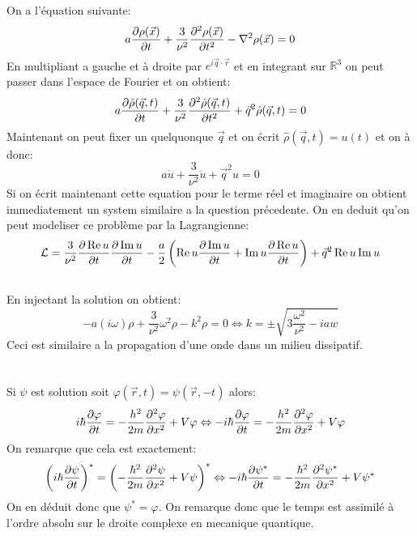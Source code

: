 \documentclass[10pt,a4paper]{article}
\begin{document}
\subsection{}
On a l'équation suivante:
\[
a \pdv{\rho(\vec{x})}{t} + \frac{3}{\nu^2} \pdv[2]{\rho(\vec{x})}{t} - \laplacian \rho (\vec{x}) = 0
\]
En multipliant a gauche et à droite par $e^{i\vec{q}\cdot \vec{r}}$ et en integrant sur $\mathbb{R}^3$ on peut passer dans l'espace de Fourier et on obtient:
\[
a \pdv{\hat{\rho}(\vec{q}, t)}{t} + \frac{3}{\nu^2} \pdv[2]{\hat{\rho}(\vec{q}, t)}{t} + \vec{q}^2 \hat{\rho}(\vec{q}, t) = 0
\]
Maintenant on peut fixer un quelquonque $\vec{q}$ et on écrit $\hat{\rho}(\vec{q}, t) = u(t)$ et on à donc:
\[
a \dot{u} + \frac{3}{\nu^2} \ddot{u} + \vec{q}^2 u = 0
\]
Si on écrit maintenant cette equation pour le terme réel et imaginaire on obtient immediatement un system similaire a la question précedente. On en deduit qu'on peut modeliser ce problème par la Lagrangienne:
\[
\mathcal{L} = \frac{3}{\nu^2} \pdv{\Re u}{t} \pdv{\Im u}{t} - \frac{a}{2}\left(\Re u \pdv{\Im u}{t} + \Im u \pdv{\Re u}{t}\right) + \vec{q}^2 \Re u \Im u
\]
\subsection{}
En injectant la solution on obtient:
\[
-a (i\omega)\rho + \frac{3}{\nu^2} \omega^2 \rho - k^2 \rho = 0 \Leftrightarrow k = \pm\sqrt{3\frac{\omega^2}{\nu^2} - i a w}
\]
Ceci est similaire a la propagation d'une onde dans un milieu dissipatif.

\section{}
\subsection{}
Si $\psi$ est solution soit $\varphi(\vec{r}, t) = \psi(\vec{r}, -t)$ alors:
\[
i\hbar \pdv{\varphi}{t} = - \frac{h^2}{2m}\pdv[2]{\varphi}{x} + V \varphi \Leftrightarrow - i\hbar \pdv{\varphi}{t} = -\frac{h^2}{2m} \pdv[2]{\varphi}{x} + V \varphi
\]
On remarque que cela est exactement:
\[
\left(i\hbar \pdv{\psi}{t} \right)^* = \left(-\frac{\hbar^2}{2m}\pdv[2]{\psi}{x} + V \psi\right)^* \Leftrightarrow - i \hbar \pdv{\psi^*}{t} = - \frac{\hbar^2}{2m}\pdv[2]{\psi^*}{x} + V\psi^*
\]
On en déduit donc que $\psi^* = \varphi$. On remarque donc que le temps est assimilé à l'ordre absolu sur le droite complexe en mecanique quantique.
\end{document}

